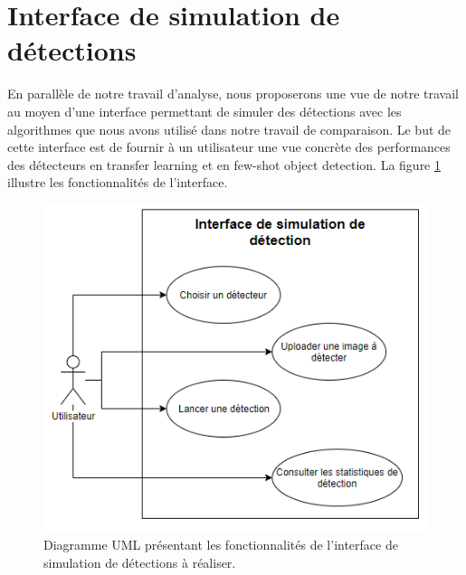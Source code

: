 

\section{Interface de simulation de détections}
En parallèle de notre travail d'analyse, nous proposerons une vue de notre travail au moyen d'une interface permettant de simuler des détections avec les algorithmes que nous avons utilisé dans notre travail de comparaison. Le but de cette interface est de fournir à un utilisateur une vue concrète des performances des détecteurs en transfer learning et en few-shot object detection. La figure \ref{fig:UML_INTERFACE} illustre les fonctionnalités de l'interface.
\begin{figure}[!h]
\centering
\includegraphics[scale=0.5]{img/UML_INTERFACE.PNG}
\caption{Diagramme UML présentant les fonctionnalités de l'interface de simulation de détections à réaliser.}
\label{fig:UML_INTERFACE}
\end{figure}


